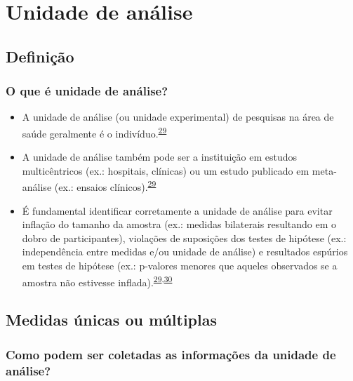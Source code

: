 \documentclass[
  a4paper,
]{book}
\begin{document}
\hypertarget{unidade-analise}{%
\chapter{\texorpdfstring{\textbf{Unidade de análise}}{Unidade de análise}}\label{unidade-analise}}

\hypertarget{definicao}{%
\section{Definição}\label{definicao}}

\hypertarget{o-que-uxe9-unidade-de-anuxe1lise}{%
\subsection{O que é unidade de análise?}\label{o-que-uxe9-unidade-de-anuxe1lise}}

\begin{itemize}
\item
  A unidade de análise (ou unidade experimental) de pesquisas na área de saúde geralmente é o indivíduo.\textsuperscript{\protect\hyperlink{ref-Altman1997}{29}}
\item
  A unidade de análise também pode ser a instituição em estudos multicêntricos (ex.: hospitais, clínicas) ou um estudo publicado em meta-análise (ex.: ensaios clínicos).\textsuperscript{\protect\hyperlink{ref-Altman1997}{29}}
\item
  É fundamental identificar corretamente a unidade de análise para evitar inflação do tamanho da amostra (ex.: medidas bilaterais resultando em o dobro de participantes), violações de suposições dos testes de hipótese (ex.: independência entre medidas e/ou unidade de análise) e resultados espúrios em testes de hipótese (ex.: p-valores menores que aqueles observados se a amostra não estivesse inflada).\textsuperscript{\protect\hyperlink{ref-Altman1997}{29},\protect\hyperlink{ref-Matthews1990}{30}}
\end{itemize}

\hypertarget{medidas}{%
\section{Medidas únicas ou múltiplas}\label{medidas}}

\hypertarget{como-podem-ser-coletadas-as-informauxe7uxf5es-da-unidade-de-anuxe1lise}{%
\subsection{Como podem ser coletadas as informações da unidade de análise?}\label{como-podem-ser-coletadas-as-informauxe7uxf5es-da-unidade-de-anuxe1lise}}
\end{document}
